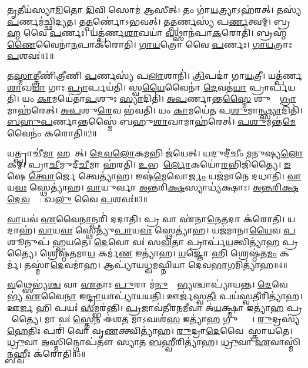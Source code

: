 \clearpage
{}
\setcounter{anuvakam}{0}

\ul{𑌤𑍃}𑌤𑍀𑌯॑𑌸𑍍𑌯𑌾\ul{𑌮𑌿}𑌤𑍋 \ul{𑌦𑌿}𑌵𑌿 𑌸𑍋𑌮॑ 𑌆𑌸𑍀𑌤𑍍।
𑌤𑌂 𑌗𑌾॑\ul{𑌯}𑌤𑍍𑌰𑍍𑌯𑌾\-𑌽𑌹॑𑌰𑌤𑍍।
𑌤𑌸𑍍𑌯॑ \ul{𑌪}𑌰𑍍𑌣𑌮॑𑌚𑍍𑌛𑌿𑌦𑍍𑌯𑌤।
𑌤\ul{𑌤𑍍𑌪}𑌰𑍍𑌣𑍋॑\-𑌽𑌭𑌵𑌤𑍍।
𑌤\ul{𑌤𑍍𑌪}𑌰𑍍𑌣𑌸𑍍𑌯॑ 𑌪\ul{𑌰𑍍𑌣}𑌤𑍍𑌵𑌮𑍍।
𑌬𑍍𑌰\ul{𑌹𑍍𑌮} 𑌵𑍈 \ul{𑌪}𑌰𑍍𑌣𑌃।
𑌯𑌤𑍍𑌪॑𑌰𑍍𑌣\ul{𑌶𑌾}𑌖𑌯𑌾॑ \ul{𑌵}𑌥𑍍𑌸𑌾𑌨॑𑌪𑌾\ul{𑌕}𑌰𑍋𑌤𑌿॑।
𑌬𑍍𑌰𑌹𑍍𑌮॑\ul{𑌣𑍈}𑌵𑍈𑌨𑌾॑\ul{𑌨}𑌪𑌾𑌕॑𑌰𑍋𑌤𑌿।
\ul{𑌗𑌾}\ul{𑌯}𑌤𑍍𑌰𑍋 𑌵𑍈 \ul{𑌪}𑌰𑍍𑌣𑌃।
\ul{𑌗𑌾}\ul{𑌯}𑌤𑍍𑌰𑌾𑌃 \ul{𑌪}𑌶𑌵𑌃॑॥1॥

𑌤\ul{𑌸𑍍𑌮𑌾}𑌤𑍍𑌤𑍍𑌰𑍀𑌣𑌿॑𑌤𑍍𑌰𑍀𑌣𑌿 \ul{𑌪}𑌰𑍍𑌣𑌸𑍍𑌯॑ 𑌪\ul{𑌲𑌾}𑌶𑌾𑌨𑌿॑।
\ul{𑌤𑍍𑌰𑌿}𑌪𑌦𑌾॑ 𑌗𑌾\ul{𑌯}𑌤𑍍𑌰𑍀।
𑌯𑌤𑍍𑌪॑𑌰𑍍𑌣\ul{𑌶𑌾}𑌖\ul{𑌯𑌾} 𑌗𑌾𑌃 \ul{𑌪𑍍𑌰𑌾}𑌰𑍍𑌪𑌯॑𑌤𑌿।
𑌸𑍍𑌵\ul{𑌯𑍈}𑌵𑍈𑌨𑌾॑ \ul{𑌦𑍇}𑌵𑌤॑\ul{𑌯𑌾} 𑌪𑍍𑌰𑌾𑌰𑍍𑌪॑𑌯𑌤𑌿।
𑌯𑌂 \ul{𑌕𑌾}𑌮𑌯𑍇॑𑌤𑌾\ul{𑌪}𑌶𑍁𑌃 \ul{𑌸𑍍𑌯𑌾}𑌦𑌿𑌤𑌿॑।
\ul{𑌅}\ul{𑌪}𑌰𑍍𑌣𑌾𑌨𑍍𑌤\ul{𑌸𑍍𑌮𑍈} 𑌶𑍁𑌷𑍍𑌕𑌾᳚\ul{𑌗𑍍𑌰𑌾}𑌮𑌾𑌹॑𑌰𑍇𑌤𑍍।
\ul{𑌅}\ul{𑌪}𑌶𑍁\ul{𑌰𑍇}𑌵 𑌭॑𑌵𑌤𑌿।
𑌯𑌂 \ul{𑌕𑌾}𑌮𑌯𑍇॑𑌤 𑌪\ul{𑌶𑍁}𑌮𑌾\ul{𑌨𑍍𑌥𑍍𑌸𑍍𑌯𑌾}𑌦𑌿𑌤𑌿॑।
\ul{𑌬}\ul{𑌹𑍁}\ul{𑌪}𑌰𑍍𑌣𑌾𑌨𑍍𑌤𑌸𑍍𑌮𑍈॑ 𑌬𑌹𑍁\ul{𑌶𑌾}𑌖𑌾𑌮𑌾𑌹॑𑌰𑍇𑌤𑍍।
\ul{𑌪}\ul{𑌶𑍁}𑌮𑌨𑍍𑌤॑\ul{𑌮𑍇}𑌵𑍈𑌨𑌂॑ 𑌕𑌰𑍋𑌤𑌿॥2॥

𑌯𑌤𑍍𑌪𑍍𑌰𑌾𑌚𑍀॑\ul{𑌮𑌾} 𑌹𑌰𑍇᳚𑌤𑍍।
\ul{𑌦𑍇}\ul{𑌵}\ul{𑌲𑍋}𑌕\ul{𑌮}𑌭𑌿 𑌜॑𑌯𑍇𑌤𑍍।
𑌯𑌦𑍁𑌦𑍀॑𑌚𑍀𑌂 𑌮𑌨𑍁𑌷𑍍𑌯\ul{𑌲𑍋}𑌕𑌮𑍍।
𑌪𑍍𑌰𑌾\ul{𑌚𑍀}𑌮𑍁𑌦𑍀॑\ul{𑌚𑍀}𑌮𑌾 𑌹॑𑌰𑌤𑌿।
\ul{𑌉}𑌭𑌯𑍋᳚\ul{𑌰𑍍𑌲𑍋}𑌕𑌯𑍋॑\ul{𑌰}𑌭𑌿\-𑌜𑌿॑𑌤𑍍𑌯𑍈।
\ul{𑌇}𑌷𑍇 \ul{𑌤𑍍𑌵𑍋}𑌰𑍍𑌜𑍇 𑌤𑍍𑌵𑍇𑌤𑍍𑌯𑌾॑𑌹।
𑌇𑌷॑\ul{𑌮𑍇}𑌵𑍋\ul{𑌰𑍍𑌜𑌂} 𑌯𑌜॑𑌮𑌾𑌨𑍇 𑌦𑌧𑌾𑌤𑌿।
\ul{𑌵𑌾}𑌯\ul{𑌵𑌃} 𑌸𑍍𑌥𑍇𑌤𑍍𑌯𑌾॑𑌹।
\ul{𑌵𑌾}𑌯𑍁𑌰𑍍𑌵𑌾 \ul{𑌅}𑌨𑍍𑌤𑌰𑌿॑\ul{𑌕𑍍𑌷}𑌸𑍍𑌯𑌾𑌧𑍍𑌯॑𑌕𑍍𑌷𑌾𑌃।
\ul{𑌅}\ul{𑌨𑍍𑌤}\ul{𑌰𑌿}\ul{𑌕𑍍𑌷}\ul{𑌦𑍇}\ul{𑌵}𑌤𑍍𑌯𑌾᳚: 𑌖\ul{𑌲𑍁} 𑌵𑍈 \ul{𑌪}𑌶𑌵𑌃॑॥3॥

\ul{𑌵𑌾}𑌯𑌵॑ \ul{𑌏}𑌵𑍈\ul{𑌨𑌾}𑌨𑍍𑌪𑌰𑌿॑ 𑌦𑌦𑌾𑌤𑌿।
𑌪𑍍𑌰 𑌵𑌾 𑌏॑𑌨𑌾\ul{𑌨𑍇}𑌤𑌦𑌾 𑌕॑𑌰𑍋𑌤𑌿।
𑌯𑌦𑌾𑌹॑।
\ul{𑌵𑌾}𑌯\ul{𑌵𑌃} 𑌸𑍍𑌥𑍇𑌤𑍍𑌯𑍁॑\ul{𑌪𑌾}𑌯\ul{𑌵𑌃} 𑌸𑍍𑌥𑍇𑌤𑍍𑌯𑌾॑𑌹।
𑌯𑌜॑𑌮𑌾𑌨𑌾\ul{𑌯𑍈}𑌵 \ul{𑌪}𑌶𑍂𑌨𑍁𑌪॑ 𑌹𑍍𑌵𑌯𑌤𑍇।
\ul{𑌦𑍇}𑌵𑍋 𑌵𑌃॑ 𑌸\ul{𑌵𑌿}𑌤𑌾 𑌪𑍍𑌰𑌾𑌰𑍍𑌪॑\ul{𑌯}𑌤𑍍𑌵𑌿𑌤𑍍𑌯𑌾॑\ul{𑌹} 𑌪𑍍𑌰𑌸𑍂᳚𑌤𑍍𑌯𑍈।
𑌶𑍍𑌰𑍇𑌷𑍍𑌠॑𑌤𑌮𑌾\ul{𑌯} 𑌕𑌰𑍍𑌮॑\ul{𑌣} 𑌇𑌤𑍍𑌯𑌾॑𑌹।
\ul{𑌯}𑌜𑍍𑌞𑍋 𑌹𑌿 𑌶𑍍𑌰𑍇𑌷𑍍𑌠॑𑌤\ul{𑌮𑌂} 𑌕𑌰𑍍𑌮॑।
𑌤𑌸𑍍𑌮𑌾॑\ul{𑌦𑍇}𑌵𑌮𑌾॑𑌹।
𑌆𑌪𑍍𑌯𑌾॑𑌯𑌧𑍍𑌵𑌮𑌘𑍍𑌨𑌿𑌯𑌾 𑌦𑍇𑌵\ul{𑌭𑌾}𑌗𑌮𑌿𑌤𑍍𑌯𑌾॑𑌹॥4॥

\ul{𑌵}𑌥𑍍𑌸𑍇𑌭𑍍𑌯॑\ul{𑌶𑍍𑌚} 𑌵𑌾 \ul{𑌏}𑌤𑌾𑌃 \ul{𑌪𑍁}𑌰𑌾 𑌮॑\ul{𑌨𑍁}𑌷𑍍𑌯𑍇᳚\ul{𑌭𑍍𑌯}𑌶𑍍𑌚𑌾𑌪𑍍𑌯𑌾॑𑌯𑌨𑍍𑌤।
\ul{𑌦𑍇}𑌵𑍇𑌭𑍍𑌯॑ \ul{𑌏}𑌵𑍈\ul{𑌨𑌾} 𑌇\ul{𑌨𑍍𑌦𑍍𑌰𑌾}𑌯𑌾𑌪𑍍𑌯𑌾॑𑌯𑌯𑌤𑌿।
𑌊𑌰𑍍𑌜॑𑌸𑍍𑌵\ul{𑌤𑍀𑌃} 𑌪𑌯॑𑌸𑍍𑌵\ul{𑌤𑍀}𑌰𑌿𑌤𑍍𑌯𑌾॑𑌹।
𑌊\ul{𑌰𑍍𑌜}\ul{} 𑌹𑌿 𑌪𑌯𑌃॑ \ul{𑌸}𑌮𑍍𑌭𑌰॑𑌨𑍍𑌤𑌿।
\ul{𑌪𑍍𑌰}𑌜𑌾𑌵॑𑌤𑍀𑌰𑌨\ul{𑌮𑍀}𑌵𑌾 𑌅॑\ul{𑌯}𑌕𑍍𑌷𑍍𑌮𑌾 𑌇𑌤𑍍𑌯𑌾॑\ul{𑌹} 𑌪𑍍𑌰𑌜𑌾᳚𑌤𑍍𑌯𑍈।
𑌮𑌾 𑌵𑌃॑ \ul{𑌸𑍍𑌤𑍇}𑌨 𑌈॑𑌶\ul{𑌤} 𑌮𑌾𑌽𑌘𑌶॑\ul{𑌸} 𑌇𑌤𑍍𑌯𑌾॑\ul{𑌹} 𑌗𑍁𑌪𑍍𑌤𑍍𑌯𑍈᳚।
\ul{𑌰𑍁}𑌦𑍍𑌰𑌸𑍍𑌯॑ \ul{𑌹𑍇}𑌤𑌿𑌃 𑌪𑌰𑌿॑ 𑌵𑍋 𑌵𑍃\ul{𑌣}𑌕𑍍𑌤𑍍𑌵𑌿𑌤𑍍𑌯𑌾॑𑌹।
\ul{𑌰𑍁}𑌦𑍍𑌰𑌾\ul{𑌦𑍇}𑌵𑍈𑌨𑌾᳚𑌸𑍍𑌤𑍍𑌰𑌾𑌯𑌤𑍇।
\ul{𑌧𑍍𑌰𑍁}𑌵𑌾 \ul{𑌅}𑌸𑍍𑌮𑌿𑌨𑍍𑌗𑍋𑌪॑𑌤𑍗 𑌸𑍍𑌯𑌾𑌤 \ul{𑌬}𑌹𑍍𑌵𑍀𑌰𑌿𑌤𑍍𑌯𑌾॑𑌹।
\ul{𑌧𑍍𑌰𑍁}𑌵𑌾 \ul{𑌏}𑌵𑌾𑌸𑍍𑌮𑌿॑\ul{𑌨𑍍𑌬}𑌹𑍍𑌵𑍀𑌃 𑌕॑𑌰𑍋𑌤𑌿॥5॥

